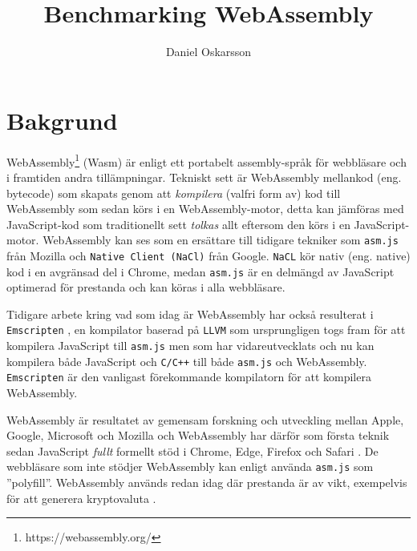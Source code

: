 \documentclass[swedish,template=rapport]{his}
\title{Benchmarking WebAssembly}
\subtitle{}
\author{Daniel Oskarsson}
\begin{document}
\maketitle

\tableofcontents

\clearpage


\section{Bakgrund}

WebAssembly\footnote{https://webassembly.org/} (Wasm) är enligt \textcite{HaasRossbergSchuffTitzerHolmanGohmanWagnerZakaiBastien2017} ett portabelt assembly-språk för webbläsare och i framtiden andra tillämpningar. Tekniskt sett är WebAssembly mellankod (eng. bytecode) som skapats genom att \emph{kompilera} (valfri form av) kod till WebAssembly \parencite{Watt2018} som sedan körs i en WebAssembly-motor, detta kan jämföras med JavaScript-kod som traditionellt sett \emph{tolkas} allt eftersom den körs i en JavaScript-motor. WebAssembly kan ses som en ersättare till tidigare tekniker som \texttt{asm.js} från Mozilla och \texttt{Native Client (NaCl)} från Google. \texttt{NaCL} kör nativ (eng. native) kod i en avgränsad del i Chrome, medan \texttt{asm.js} \parencite{Zakai2018} är en delmängd av JavaScript optimerad för prestanda \parencite{VanEsNicolayStievenartDHondtDeRoover2016} och kan köras i alla webbläsare.

Tidigare arbete kring vad som idag är WebAssembly har också resulterat i \texttt{Emscripten} \parencite{Zakai2011}, en kompilator baserad på \texttt{LLVM} \parencite{LattnerAdve2014} som ursprungligen togs fram för att kompilera JavaScript till \texttt{asm.js} \parencite{Zakai2011} men som har vidareutvecklats \parencite{HaasRossbergSchuffTitzerHolmanGohmanWagnerZakaiBastien2017} och nu kan kompilera både JavaScript och \texttt{C/C++} till både \texttt{asm.js} och WebAssembly. \texttt{Emscripten} är den vanligast förekommande kompilatorn för att kompilera WebAssembly.

WebAssembly är resultatet av gemensam forskning och utveckling mellan  Apple, Google, Microsoft och Mozilla \parencite{HaasRossbergSchuffTitzerHolmanGohmanWagnerZakaiBastien2017} och WebAssembly har därför som första teknik sedan JavaScript \emph{fullt} formellt stöd i Chrome, Edge, Firefox och Safari \parencite{Moller2018}. De webbläsare som inte stödjer WebAssembly kan enligt \textcite{HaasRossbergSchuffTitzerHolmanGohmanWagnerZakaiBastien2017} använda \texttt{asm.js}  som ''polyfill''. WebAssembly används redan idag där prestanda är av vikt, exempelvis för att generera kryptovaluta \parencite{RuthZimmermannWolsingHohlfeld2018}.
\end{document}
